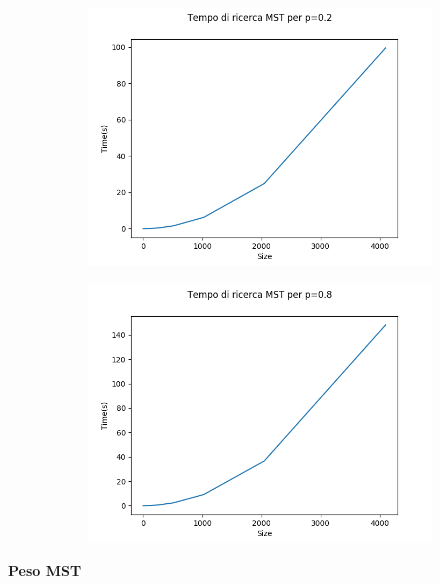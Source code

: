 \documentclass[]{article}
\begin{document}
\begin{figure}[H]
    \centering
    \begin{subfigure}[b]{0.45\linewidth} 
        \centering
        \includegraphics[width=\textwidth]{krusk_time_p=02}
        \label{fig:krusk_time_p=02}
    \end{subfigure}
    \quad
    \begin{subfigure}[b]{0.45\linewidth}
        \centering
        \includegraphics[width=\textwidth]{krusk_time_p=08}
        \label{fig:krusk_time_p=08}
    \end{subfigure}
\end{figure}

\textbf{Peso MST}\\
\end{document}
